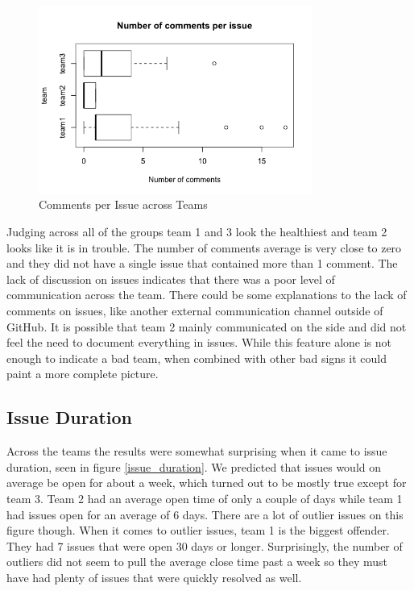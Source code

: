 \documentclass[conference]{IEEEtran}
\begin{document}
\begin{figure}[H]
    \centering
    \includegraphics[width=9cm]{../AprilProject/pic/comments_per_issue.png}
    \caption{Comments per Issue across Teams}
    \label{comments_issue}
\end{figure}

Judging across all of the groups team 1 and 3 look the healthiest and team 2 looks like it is in trouble. The number of comments average is very close to zero and they did not have a single issue that contained more than 1 comment. The lack of discussion on issues indicates that there was a poor level of communication across the team. There could be some explanations to the lack of comments on issues, like another external communication channel outside of GitHub. It is possible that team 2 mainly communicated on the side and did not feel the need to document everything in issues. While this feature alone is not enough to indicate a bad team, when combined with other bad signs it could paint a more complete picture. 

\subsection{Issue Duration}
Across the teams the results were somewhat surprising when it came to issue duration, seen in figure \ref{issue_duration}. We predicted that issues would on average be open for about a week, which turned out to be mostly true except for team 3. Team 2 had an average open time of only a couple of days while team 1 had issues open for an average of 6 days. There are a lot of outlier issues on this figure though. When it comes to outlier issues, team 1 is the biggest offender. They had 7 issues that were open 30 days or longer. Surprisingly, the number of outliers did not seem to pull the average close time past a week so they must have had plenty of issues that were quickly resolved as well. 
\end{document}
